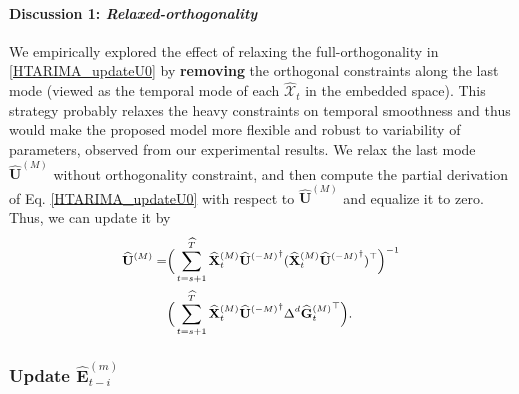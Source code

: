 \documentclass[letterpaper]{article} %
\numberwithin{theorem}{section}
\newcommand{\ten}[1]{ \boldsymbol{\mathcal #1}}
\begin{document}
\paragraph{\textbf{Discussion 1}: \textit{Relaxed-orthogonality}}
We empirically explored the effect of  relaxing the  full-orthogonality  in  \eqref{HTARIMA_updateU0} by  \textbf{removing} the orthogonal constraints along the last  mode (viewed as the temporal mode of each $\widehat{\ten{X}}_t$ in the embedded space). This  strategy   probably  relaxes  the heavy constraints on temporal smoothness and thus would make the proposed model more flexible and  robust  to  variability of  parameters, observed from  our experimental results.  We relax the last mode $\widehat{\mathbf U}^{(M)}$ without orthogonality constraint,  and then compute the partial derivation of  Eq. \eqref{HTARIMA_updateU0} with respect to $\widehat{\mathbf U}^{(M)}$  and  equalize it to zero. Thus, we can update it by 
\begin{equation}\label{HTARIMA_UpdateUM}
\small 
\begin{aligned}
\widehat{ \mathbf U}{^{(M)}}        = &  \Big(\hspace{-0.01cm}  \sum_{t=s+1}^{\widehat{T}} {\widehat{\mathbf{X}}^{(M)}_{t}}      \widehat{ \mathbf U}{^{(-M)}}^\dagger  ({\widehat{\mathbf{X}}^{(M)}_{t}}      \widehat{ \mathbf U}{^{(-M)}}^\dagger)^\top  \hspace{-0.01cm}  \Big)^{-1}  \\&   \Big(\hspace{-0.01cm}  \sum_{t=s+1}^{\widehat{T}} {\widehat{\mathbf{X}}^{(M)}_{t}}      \widehat{ \mathbf U}{^{(-M)}}^\dagger \Delta^d  {\widehat{\mathbf{G}}{^{(M)}_{t}}}^\top   \hspace{-0.01cm}   \Big).
\end{aligned}
\end{equation}


\subsubsection{Update  $\widehat{\mathbf{E}}^{(m)}_{{t-i}} $  }
\end{document}
